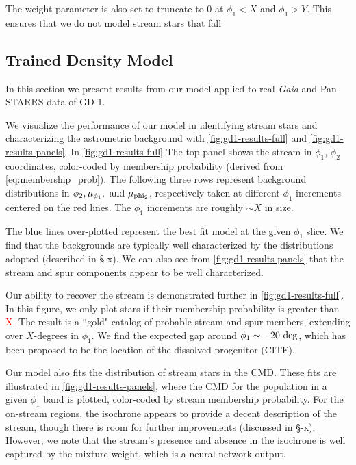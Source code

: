 \documentclass[twocolumn]{aastex631}
\newcommand{\TODO}[1]{{\textcolor{red}{#1}}}
\newcommand{\JN}[1]{\TODO{#1}}
\begin{document}
        The weight parameter is also set to truncate to $0$ at $\phi_1 < X$ and $\phi_1 > Y$. This ensures that we do not model stream stars that fall 
    
        
    \subsection{Trained Density Model}\label{ssub:trained_gd1}
    
        In this section we present results from our model applied to real {\it
        Gaia} and Pan-STARRS data of GD-1. 

        We visualize the performance of our model in identifying stream stars
        and characterizing the astrometric background with
        \autoref{fig:gd1-results-full} and \autoref{fig:gd1-results-panels}. In
        \autoref{fig:gd1-results-full} The top panel shows the stream in
        $\phi_1$, $\phi_2$ coordinates, color-coded by membership probability
        (derived from \autoref{eq:membership_prob}). The following three rows
        represent background distributions in $\phi_2, \mu_{\phi_1}, \rm{\ and}
        \ \mu_{\rm phi_2}$, respectively taken at different $\phi_1$ increments
        centered on the red lines. The $\phi_1$ increments are roughly $\sim X$
        in size.

        The blue lines over-plotted represent the best fit model at the given
        $\phi_1$ slice. We find that the backgrounds are typically well
        characterized by the distributions adopted (described in \S-x). We can
        also see from \autoref{fig:gd1-results-panels} that the stream and spur
        components appear to be well characterized. 
        
        Our ability to recover the stream is demonstrated further in
        \autoref{fig:gd1-results-full}. In this figure, we only plot stars if
        their membership probability is greater than \JN{X}. The result is a
        ``gold" catalog of probable stream and spur members, extending over
        $X$-degrees in $\phi_1$. We find the expected gap around $\phi_1 \sim
        -20~\rm{deg}$, which has been proposed to be the location of the
        dissolved progenitor (CITE).

        Our model also fits the distribution of stream stars in the CMD. These
        fits are illustrated in \autoref{fig:gd1-results-panels}, where the CMD
        for the population in a given $\phi_1$ band is plotted, color-coded by
        stream membership probability. For the on-stream regions, the isochrone
        appears to provide a decent description of the stream, though there is
        room for further improvements (discussed in \S-x). However, we note that
        the stream's presence and absence in the isochrone is well captured by
        the mixture weight, which is a neural network output. 
        
\end{document}
